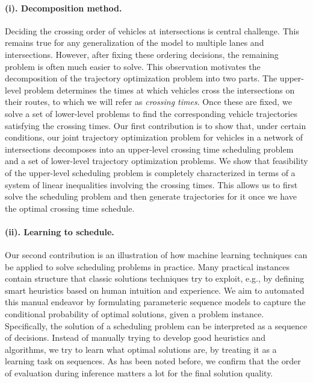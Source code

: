 \documentclass[a4paper]{report}
\theoremstyle{definition}
\theoremstyle{plain}
\begin{document}
\paragraph{(i). Decomposition method.}
Deciding the crossing order of vehicles at intersections is central challenge.
This remains true for any generalization of the model to multiple lanes and
intersections.
%
However, after fixing these ordering decisions, the remaining problem is often
much easier to solve. This observation motivates the decomposition of the
trajectory optimization problem into two parts.
%
The upper-level problem determines the times at which vehicles cross the
intersections on their routes, to which we will refer as \emph{crossing times}.
%
Once these are fixed, we solve a set of lower-level problems to find the
corresponding vehicle trajectories satisfying the crossing times.
%
Our first contribution is to show that, under certain conditions, our joint
trajectory optimization problem for vehicles in a network of intersections
decomposes into an upper-level crossing time scheduling problem and a set of
lower-level trajectory optimization problems. We show that feasibility of the
upper-level scheduling problem is completely characterized in terms of a system
of linear inequalities involving the crossing times. This allows us to first
solve the scheduling problem and then generate trajectories for it once we have
the optimal crossing time schedule.

\paragraph{(ii). Learning to schedule.}
Our second contribution is an illustration of how machine learning techniques
can be applied to solve scheduling problems in practice.
%
Many practical instances contain structure that classic solutions techniques try
to exploit, e.g., by defining smart heuristics based on human intuition and
experience.
%
We aim to automated this manual endeavor by formulating parameteric sequence
models to capture the conditional probability of optimal solutions, given a
problem instance.
%
Specifically, the solution of a scheduling problem can be interpreted as a
sequence of decisions.
%
Instead of manually trying to develop good heuristics and algorithms, we try to
learn what optimal solutions are, by treating it as a learning task on
sequences.
%
As has been noted before, we confirm that the order of evaluation during
inference matters a lot for the final solution quality.
\end{document}
